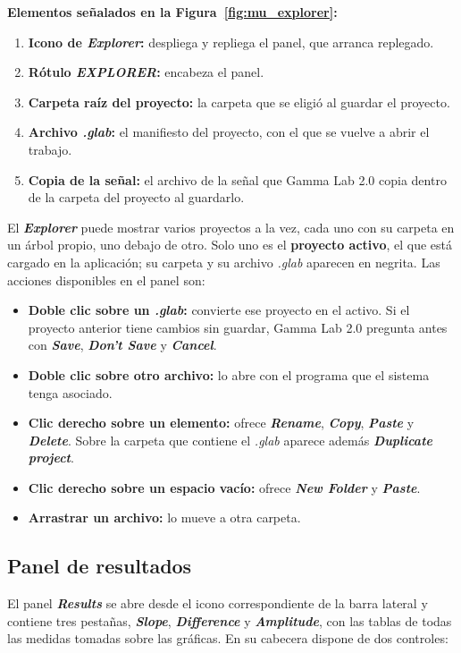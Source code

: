 \documentclass[11pt,a4paper]{article}
\newenvironment{senalamientos}[1]{%
  \par\noindent\textbf{Elementos se\~nalados en la Figura~\ref{#1}:}%
  \begin{enumerate}[label=(\arabic*),leftmargin=2.4em,itemsep=2pt,topsep=4pt]}
  {\end{enumerate}}
\begin{document}
    \begin{senalamientos}{fig:mu_explorer}
        \item \textbf{Icono de \textit{Explorer}:} despliega y repliega el panel, que arranca replegado.
        \item \textbf{R\'otulo \textit{EXPLORER}:} encabeza el panel.
        \item \textbf{Carpeta ra\'iz del proyecto:} la carpeta que se eligi\'o al guardar el proyecto.
        \item \textbf{Archivo \textit{.glab}:} el manifiesto del proyecto, con el que se vuelve a abrir el trabajo.
        \item \textbf{Copia de la se\~nal:} el archivo de la se\~nal que Gamma Lab 2.0 copia dentro de la carpeta del proyecto al guardarlo.
    \end{senalamientos}

    El \textbf{\textit{Explorer}} puede mostrar varios proyectos a la vez, cada uno con su carpeta en un \'arbol propio, uno debajo de otro. Solo uno es el \textbf{proyecto activo}, el que est\'a cargado en la aplicaci\'on; su carpeta y su archivo \textit{.glab} aparecen en negrita. Las acciones disponibles en el panel son:

    \begin{itemize}
        \item \textbf{Doble clic sobre un \textit{.glab}:} convierte ese proyecto en el activo. Si el proyecto anterior tiene cambios sin guardar, Gamma Lab 2.0 pregunta antes con \textbf{\textit{Save}}, \textbf{\textit{Don't Save}} y \textbf{\textit{Cancel}}.
        \item \textbf{Doble clic sobre otro archivo:} lo abre con el programa que el sistema tenga asociado.
        \item \textbf{Clic derecho sobre un elemento:} ofrece \textbf{\textit{Rename}}, \textbf{\textit{Copy}}, \textbf{\textit{Paste}} y \textbf{\textit{Delete}}. Sobre la carpeta que contiene el \textit{.glab} aparece adem\'as \textbf{\textit{Duplicate project}}.
        \item \textbf{Clic derecho sobre un espacio vac\'io:} ofrece \textbf{\textit{New Folder}} y \textbf{\textit{Paste}}.
        \item \textbf{Arrastrar un archivo:} lo mueve a otra carpeta.
    \end{itemize}


    \subsection{Panel de resultados}
    El panel \textbf{\textit{Results}} se abre desde el icono correspondiente de la barra lateral y contiene tres pesta\~nas, \textbf{\textit{Slope}}, \textbf{\textit{Difference}} y \textbf{\textit{Amplitude}}, con las tablas de todas las medidas tomadas sobre las gr\'aficas. En su cabecera dispone de dos controles:
\end{document}
